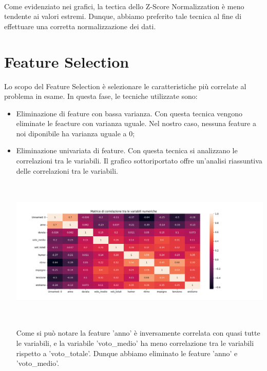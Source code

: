 \documentclass[a4paper, 10pt]{report}
\begin{document}
            \\Come evidenziato nei grafici, la tectica dello Z-Score Normalizzation è meno tendente ai valori estremi.
            Dunque, abbiamo preferito tale tecnica al fine di effettuare una corretta normalizzazione dei dati.

        \section{Feature Selection}\label{sec:feature-selection}
            Lo scopo del Feature Selection è selezionare le caratteristiche più correlate al problema in esame.
            In questa fase, le tecniche utilizzate sono:
            \begin{itemize}
                \item Eliminazione di feature con bassa varianza. Con questa tecnica vengono eliminate le feacture
                con varianza uguale. Nel nostro caso, nessuna feature a noi diponibile ha varianza uguale a 0;
                \item Eliminazione univariata di feature. Con questa tecnica si analizzano le correlazioni tra le variabili.
                Il grafico sottoriportato offre un'analisi riassuntiva delle correlazioni tra le variabili.
                \begin{center}
                    \includegraphics[width=13cm, height=7cm]{dataPreparation/Matrice di Correlazione.png}\\
                \end{center}
                Come si può notare la feature 'anno' è inversamente correlata con quasi tutte le variabili, e la variabile
                'voto\_medio' ha meno correlazione tra le variabili rispetto a 'voto\_totale'.
                Dunque abbiamo eliminato le feature 'anno' e 'voto\_medio'.
            \end{itemize}
\end{document}

